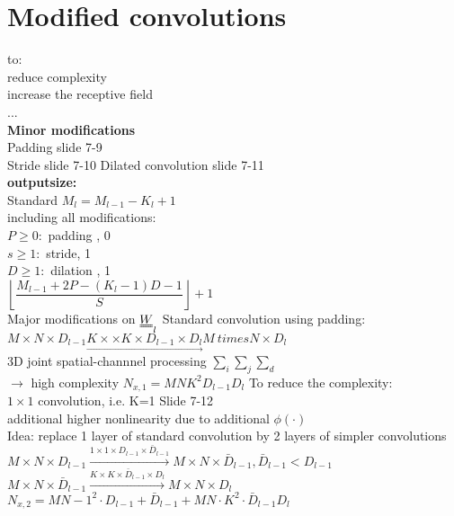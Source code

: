 \section{Modified convolutions}
to:\\
\textbullet reduce complexity \\
\textbullet increase the receptive field\\
\textbullet ... \\
\textbf{Minor modifications }\\
\textbullet Padding slide 7-9 \\
\textbullet Stride slide 7-10  
\textbullet Dilated convolution slide 7-11\\
\textbf{outputsize:} \\
Standard $ M_l = M_{l-1 } - K_l + 1   $\\
including all modifications:\\
$ P \geq 0:  $ padding , 0 \\
$ s \geq 1:  $ stride, 1 \\
$ D\geq 1 :  $ dilation , 1 \\
$ \left\lfloor \dfrac{M_{l-1} + 2P - (K_l -1) D-1}{S} \right\rfloor +1 $\\
Major modifications on $ \W_l $
\textbullet Standard convolution using padding:\\
$  M \times N \times D_{l-1} \underset{\rightarrow}{K \times \times K \times D_{l-1} \times D_l}  M \ times N \times D_l$ \\
3D joint spatial-channnel processing $  \sum_i \sum _j \sum_d  $\\
$ \rightarrow $ high complexity $  N_{x,1} = MNK^2 D_{l-1 } D_l  $
To reduce the complexity:\\
\textbullet $  1 \times 1  $ convolution, i.e. K=1 Slide 7-12\\
\textbullet additional higher nonlinearity due to additional $ \phi(\cdot) $\\
Idea: replace 1 layer of standard convolution by 2 layers of simpler convolutions\\
\textbullet $ M \times N \times D_{l-1 } \overset{1 \times 1 \times D_{l-1 } \times \bar{D} _{l-1 } }{\longrightarrow} M \times N \times \bar{D}_{l-1 } , \bar{D}_{l-1} < D_{l-1 }$\\
\textbullet $  M \times N \times \bar{D}_{l-1 } \overset{K \times K \times \bar{D}_{l-1 } \times D_l}{\longrightarrow} M \times N \times D_l $
$ N_{x,2 } = MN- 1^2 \cdot D_{l-1} + \bar{D}_{l-1 } + MN \cdot K^2 \cdot \bar{D}_{l-1} D_l $\\
